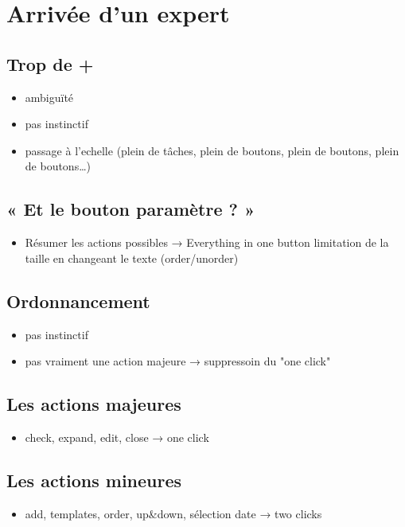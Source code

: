 \documentclass[11pt]{article}
\begin{document}
\section[Arrivée d'un expert]{Arrivée d'un expert}
\label{sec-3}

\subsection[Trop de +]{Trop de +}
\label{sec-3-1}
\begin{itemize}
\item ambiguïté
\item pas instinctif
\item passage à l'echelle (plein de tâches, plein de boutons, plein de
boutons, plein de boutons\ldots{})
\end{itemize}
\subsection[« Et le bouton paramètre ? »]{« Et le bouton paramètre ? »}
\label{sec-3-2}
\begin{itemize}
\item Résumer les actions possibles → Everything in one button
limitation de la taille en changeant le texte (order/unorder)
\end{itemize}
\subsection[Ordonnancement]{Ordonnancement}
\label{sec-3-3}
\begin{itemize}
\item pas instinctif
\item pas vraiment une action majeure
→ suppressoin du "one click"
\end{itemize}
\subsection[Les actions majeures]{Les actions majeures}
\label{sec-3-4}
\begin{itemize}
\item check, expand, edit, close
→ one click
\end{itemize}
\subsection[Les actions mineures]{Les actions mineures}
\label{sec-3-5}
\begin{itemize}
\item add, templates, order, up\&down, sélection date
→ two clicks
\end{itemize}
\end{document}
